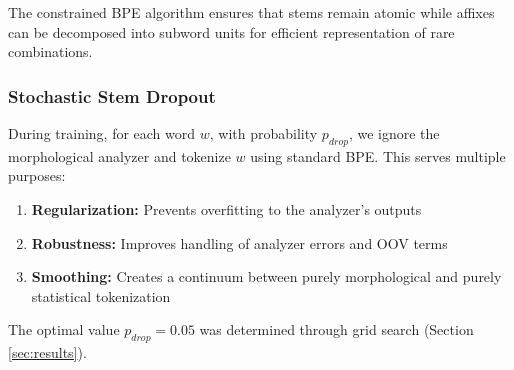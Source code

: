\documentclass[conference]{IEEEtran}
\begin{document}
The constrained BPE algorithm ensures that stems remain atomic while affixes can be decomposed into subword units for efficient representation of rare combinations.

\subsubsection{Stochastic Stem Dropout}
During training, for each word $w$, with probability $p_{drop}$, we ignore the morphological analyzer and tokenize $w$ using standard BPE. This serves multiple purposes:
\begin{enumerate}
    \item \textbf{Regularization:} Prevents overfitting to the analyzer's outputs
    \item \textbf{Robustness:} Improves handling of analyzer errors and OOV terms
    \item \textbf{Smoothing:} Creates a continuum between purely morphological and purely statistical tokenization
\end{enumerate}

The optimal value $p_{drop} = 0.05$ was determined through grid search (Section \ref{sec:results}).
\end{document}

